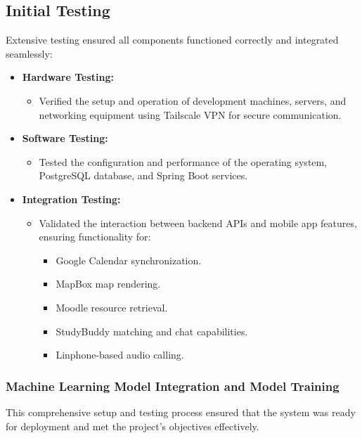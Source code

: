 \documentclass{article}
\begin{document}
\subsection{Initial Testing}  
Extensive testing ensured all components functioned correctly and integrated seamlessly:  

\begin{itemize}  
    \item \textbf{Hardware Testing:}  
    \begin{itemize}  
        \item Verified the setup and operation of development machines, servers, and networking equipment using Tailscale VPN for secure communication.  
    \end{itemize}  

    \item \textbf{Software Testing:}  
    \begin{itemize}  
        \item Tested the configuration and performance of the operating system, PostgreSQL database, and Spring Boot services.  
    \end{itemize}  

    \item \textbf{Integration Testing:}  
    \begin{itemize}  
        \item Validated the interaction between backend APIs and mobile app features, ensuring functionality for:  
        \begin{itemize}  
            \item Google Calendar synchronization.  
            \item MapBox map rendering.  
            \item Moodle resource retrieval.  
            \item StudyBuddy matching and chat capabilities.  
            \item Linphone-based audio calling.  
        \end{itemize}  
    \end{itemize}  
\end{itemize}

\subsubsection{Machine Learning Model Integration and Model Training}

This comprehensive setup and testing process ensured that the system was ready for deployment and met the project's objectives effectively.  
\end{document}
